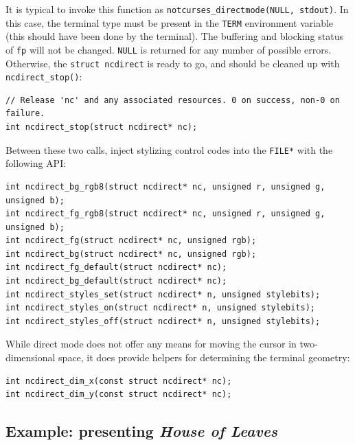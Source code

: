\documentclass[letterpaper,10pt]{article}
\begin{document}
It is typical to invoke this function as \texttt{notcurses\_directmode(NULL, stdout)}.
In this case, the terminal type must be present in the \texttt{TERM} environment
variable (this should have been done by the terminal). The buffering and
blocking status of \texttt{fp} will not be changed. \texttt{NULL} is returned for any number
of possible errors. Otherwise, the \texttt{struct ncdirect} is ready to go, and should
be cleaned up with \texttt{ncdirect\_stop()}:

\begin{listing}[ht]
\begin{verbatim}
// Release 'nc' and any associated resources. 0 on success, non-0 on failure.
int ncdirect_stop(struct ncdirect* nc);
\end{verbatim}
\end{listing}

Between these two calls, inject stylizing control codes into the \texttt{FILE*} with
the following API:

\begin{listing}[ht]
\begin{verbatim}
int ncdirect_bg_rgb8(struct ncdirect* nc, unsigned r, unsigned g, unsigned b);
int ncdirect_fg_rgb8(struct ncdirect* nc, unsigned r, unsigned g, unsigned b);
int ncdirect_fg(struct ncdirect* nc, unsigned rgb);
int ncdirect_bg(struct ncdirect* nc, unsigned rgb);
int ncdirect_fg_default(struct ncdirect* nc);
int ncdirect_bg_default(struct ncdirect* nc);
int ncdirect_styles_set(struct ncdirect* n, unsigned stylebits);
int ncdirect_styles_on(struct ncdirect* n, unsigned stylebits);
int ncdirect_styles_off(struct ncdirect* n, unsigned stylebits);
\end{verbatim}
\end{listing}

While direct mode does not offer any means for moving the cursor in
two-dimensional space, it does provide helpers for determining the terminal
geometry:

\begin{verbatim}
int ncdirect_dim_x(const struct ncdirect* nc);
int ncdirect_dim_y(const struct ncdirect* nc);
\end{verbatim}

\subsection{Example: presenting \textit{House of Leaves}}
\end{document}
